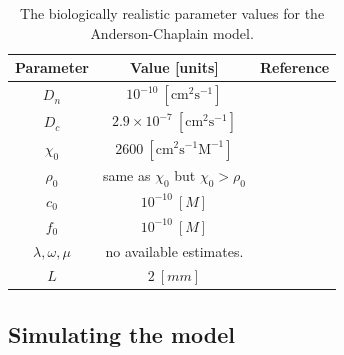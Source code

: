 \begin{table}[!ht]
	\centering
	\begin{tabular}{|c|c|c|}
		\hline
		\textbf{Parameter}       & \textbf{Value {[}units{]}}                       & \textbf{Reference} \\ \hline
		$D_n$                    & $10^{-10}\ [\text{cm}^2\text{s}^{-1}]$           &  \cite{Bray2000}   \\ \hline
		$ D_c $                  & $2.9 \times 10^{-7}\ [\text{cm}^2\text{s}^{-1}]$  & \cite{Bray2000,Sherratt1990} \\ \hline
		$\chi_0$                 & $ 2600\ [\text{cm}^2\text{s}^{-1}\text{M}^{-1}] $ &  \cite{Stokes1990}  \\ \hline
		$ \rho_0 $               & same as $\chi_0$ but $ \chi_0  > \rho_0 $        & \cite{Anderson1998}   \\ \hline
		$ c_0 $                  & $10^{-10}\ [M]$                               &   \cite{Stokes1990} \\ \hline
		$ f_0 $                  & $10^{-10}\ [M]$                               &  \cite{Terranova1985}  \\ \hline
		$ \lambda, \omega, \mu $ & no available estimates.                          &  \cite{Hynes1989-je}  \\ \hline
		$ L $                    &   $ 2\ [mm] $       &     \cite{Gimbrone1974}     \\ \hline
	\end{tabular}
	\caption{The biologically realistic parameter values for the Anderson-Chaplain model.}
	\label{tab:AndersonChaplainModelRealisticParameters}
\end{table}
\FloatBarrier


\subsection{Simulating the model}

